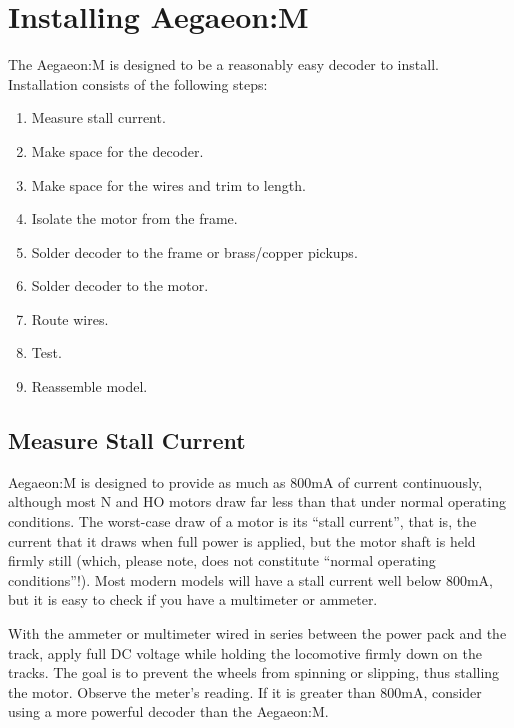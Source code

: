 \documentclass[12pt,letterpaper,draft]{memoir} %
\begin{document}

\section{Installing Aegaeon:M}

The Aegaeon:M is designed to be a reasonably easy decoder to install. Installation consists of the following steps:
\begin{enumerate}
\item Measure stall current.
\item Make space for the decoder.
\item Make space for the wires and trim to length.
\item Isolate the motor from the frame.
\item Solder decoder to the frame or brass/copper pickups.
\item Solder decoder to the motor.
\item Route wires.
\item Test.
\item Reassemble model.
\end{enumerate}

\subsection{Measure Stall Current}
Aegaeon:M is designed to provide as much as 800mA of current continuously, although most N and HO motors draw far less than that under normal operating conditions. The worst-case draw of a motor is its ``stall current'', that is, the current that it draws when full power is applied, but the motor shaft is held firmly still (which, please note, does not constitute ``normal operating conditions''!). Most modern models will have a stall current well below 800mA, but it is easy to check if you have a multimeter or ammeter.

With the ammeter or multimeter wired in series between the power pack and the track, apply full DC voltage while holding the locomotive firmly down on the tracks. The goal is to prevent the wheels from spinning or slipping, thus stalling the motor. Observe the meter's reading. If it is greater than 800mA, consider using a more powerful decoder than the Aegaeon:M.
\end{document}
